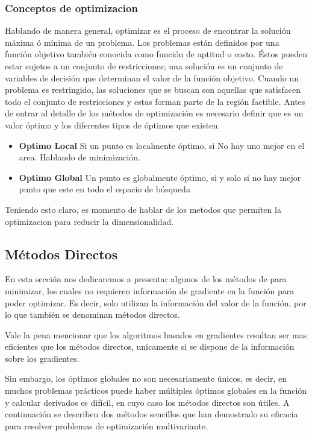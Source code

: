\documentclass[12pt,letterpaper]{report}
\begin{document}
\subsubsection{Conceptos de optimizacion}
Hablando de manera general, optimizar es el proceso de encontrar la solución máxima ó mínima de un problema. Los problemas están definidos por una función objetivo también conocida como función de aptitud o costo. Éstos pueden estar sujetos a un conjunto de restricciones; una solución es un
conjunto de variables de decisión que determinan el valor de la función objetivo. Cuando un problema es restringido, las soluciones que se buscan son aquellas que satisfacen todo el conjunto de restricciones y estas forman parte de la región factible.
Antes de entrar al detalle de los métodos de optimización es necesario definir que es un valor óptimo y los diferentes tipos de óptimos que existen.

\begin{itemize}
	\item \textbf{Optimo Local}
	Si un punto es localmente óptimo, si No hay uno mejor en el area. Hablando de minimización.
	\item \textbf{Optimo Global}
	Un punto es globalmente óptimo, si y solo si no hay mejor punto que este en todo el espacio de búsqueda
\end{itemize}

Teniendo esto claro, es momento de hablar de los metodos que permiten la optimizacion para reducir la dimensionalidad.

\subsection{Métodos Directos}

En esta sección nos dedicaremos a presentar algunos de los métodos de para minimizar, los cuales no requieren información de gradiente en la función para poder optimizar. Es decir, solo utilizan la información del valor de la función, por lo que también se denominan métodos directos.

Vale la pena mencionar que los algoritmos basados en gradientes resultan ser mas eficientes que los métodos directos, unicamente si se dispone de la información sobre los gradientes.

Sin embargo, los óptimos globales no son necesariamente únicos, es decir, en muchos problemas prácticos puede haber múltiples óptimos globales en la función y calcular derivados es difícil, en cuyo caso los métodos directos son útiles. 
A continuación se describen dos métodos sencillos que han demostrado su eficacia para resolver problemas de optimización multivariante.
\end{document}
